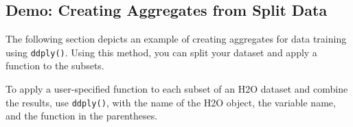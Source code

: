 {{%

\subsection{Demo: Creating Aggregates from Split Data}

The following section depicts an example of creating aggregates for data training using {\texttt{ddply()}}. Using this method, you can split your dataset and apply a function to the subsets.

To apply a user-specified function to each subset of an H2O dataset and combine the results, use {\texttt{ddply()}}, with the name of the H2O object, the variable name, and the function in the parentheses.

}}
